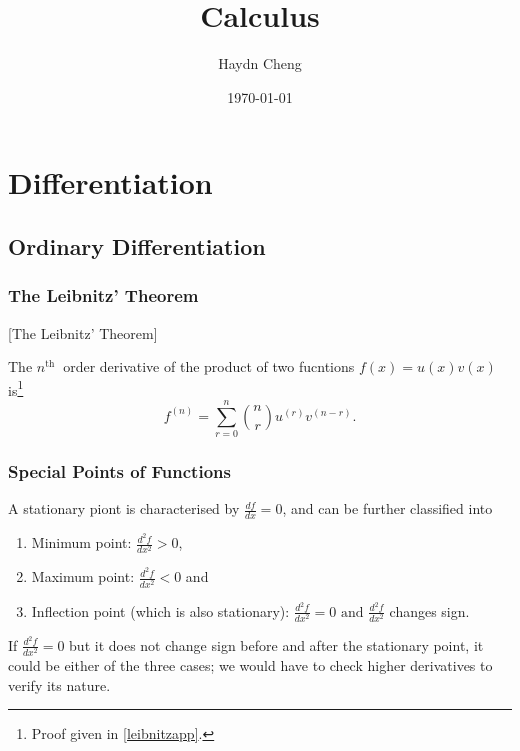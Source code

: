 \documentclass[english,a4paper,12pt]{report}
\title{Calculus}
\author{Haydn Cheng}
\date{\today}
\begin{document}
\maketitle
\tableofcontents

\chapter{Differentiation}

\section{Ordinary Differentiation}

\subsection{The Leibnitz' Theorem}[The Leibnitz' Theorem] \label{leibnitz} 
\begin{theorem}
    The \(n^{\text{th }} \) order derivative of the product of two fucntions \(f(x) = u(x)v(x)\) is\footnote{Proof given in \cref{leibnitzapp}.}  
    \begin{equation}
        f^{(n)} = \sum_{r=0}^{n} \binom{n}{r} u^{(r)} v^{(n-r)}. \label{lei} 
    \end{equation}
\end{theorem}

\subsection{Special Points of Functions}

A stationary piont is characterised by \(\displaystyle \frac{df}{dx} = 0\), and can be further classified into 

\begin{enumerate}
    \item Minimum point: \(\displaystyle \frac{d^2f}{dx^2} > 0\),
    \item Maximum point: \(\displaystyle \frac{d^2f}{dx^2} < 0\) and
    \item Inflection point (which is also stationary): \(\displaystyle \frac{d^2f}{dx^2} = 0 \text { and }  \frac{d^2f}{dx^2} \)  changes sign.
\end{enumerate}

If \(\displaystyle \frac{d^2f}{dx^2} = 0\) but it does not change sign before and after the stationary point, it could be either of the three cases; we would have to check higher derivatives to verify its nature. 
\end{document}
